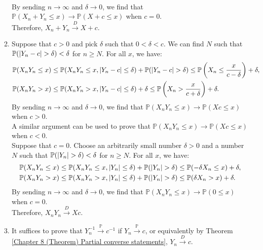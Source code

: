 \documentclass{huhtakm-template-book-v2}
\newcommand{\prob}{\mathbb{P}}
\begin{document}
\begin{proofing}
\begin{enumerate}
\begin{align*}
            \end{align*}
            By sending $n \to \infty$ and $\delta \to 0$, we find that $\prob(X_{n}+Y_{n} \leq x) \to \prob(X+c \leq x)$ when $c = 0$.\\
            Therefore, $X_{n}+Y_{n} \xrightarrow{D} X+c$.
            \item Suppose that $c > 0$ and pick $\delta$ such that $0 < \delta < c$. We can find $N$ such that $\prob(\abs{Y_{n}-c} > \delta) < \delta$ for $n \geq N$. For all $x$, we have:
            \begin{align*}
                \prob(X_{n}Y_{n} \leq x) &\leq \prob(X_{n}Y_{n} \leq x,\abs{Y_{n}-c} \leq \delta)+\prob(\abs{Y_{n}-c} > \delta) \leq \prob\left(X_{n} \leq \frac{x}{c-\delta}\right)+\delta,\\
                \prob(X_{n}Y_{n} > x) &\leq \prob(X_{n}Y_{n} > x,\abs{Y_{n}-c} \leq \delta)+\delta \leq \prob\left(X_{n} > \frac{x}{c+\delta}\right)+\delta.
            \end{align*}
            By sending $n \to \infty$ and $\delta \to 0$, we find that $\prob(X_{n}Y_{n} \leq x) \to \prob(Xc \leq x)$ when $c > 0$.\\
            A similar argument can be used to prove that $\prob(X_{n}Y_{n} \leq x) \to \prob(Xc \leq x)$ when $c < 0$.\\
            Suppose that $c = 0$. Choose an arbitrarily small number $\delta > 0$ and a number $N$ such that $\prob(\abs{Y_{n}} > \delta) < \delta$ for $n \geq N$. For all $x$, we have:
            \begin{align*}
                \prob(X_{n}Y_{n} \leq x) &\leq \prob(X_{n}Y_{n} \leq x,\abs{Y_{n}} \leq \delta)+\prob(\abs{Y_{n}} > \delta) \leq \prob(-\delta X_{n} \leq x)+\delta,\\
                \prob(X_{n}Y_{n} > x) &\leq \prob(X_{n}Y_{n} > x,\abs{Y_{n}} \leq \delta)+\prob(\abs{Y_{n}} > \delta) \leq \prob(\delta X_{n} > x)+\delta.
            \end{align*}
            By sending $n \to \infty$ and $\delta \to 0$, we find that $\prob(X_{n}Y_{n} \leq x) \to \prob(0 \leq x)$ when $c = 0$.\\
            Therefore, $X_{n}Y_{n} \xrightarrow{D} Xc$.
            \item It suffices to prove that $Y_{n}^{-1} \xrightarrow{\prob} c^{-1}$ if $Y_{n} \xrightarrow{\prob} c$, or equivalently by Theorem \ref{Chapter 8 (Theorem) Partial converse statements}, $Y_{n} \xrightarrow{D} c$.\\

\end{enumerate}
\end{proofing}
\end{document}
